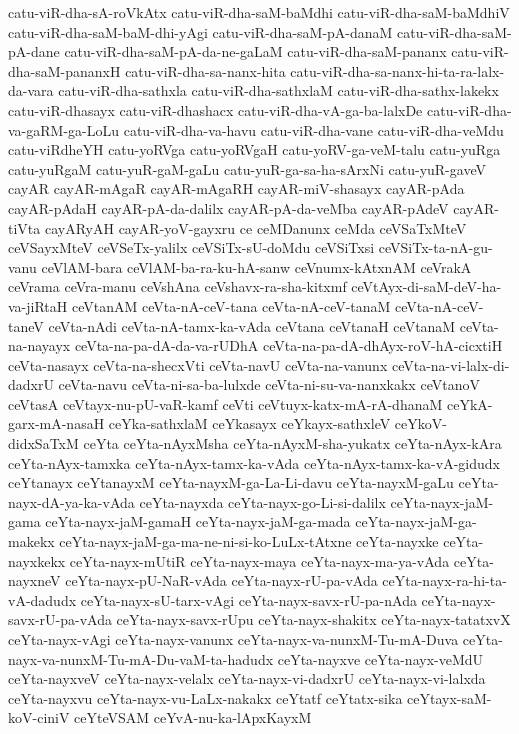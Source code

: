 {catu-viR-dha-sA-roVkAtx
catu-viR-dha-saM-baMdhi
catu-viR-dha-saM-baMdhiV
catu-viR-dha-saM-baM-dhi-yAgi
catu-viR-dha-saM-pA-danaM
catu-viR-dha-saM-pA-dane
catu-viR-dha-saM-pA-da-ne-gaLaM
catu-viR-dha-saM-pananx
catu-viR-dha-saM-pananxH
catu-viR-dha-sa-nanx-hita
catu-viR-dha-sa-nanx-hi-ta-ra-lalx-da-vara
catu-viR-dha-sathxla
catu-viR-dha-sathxlaM
catu-viR-dha-sathx-lakekx
catu-viR-dhasayx
catu-viR-dhashacx
catu-viR-dha-vA-ga-ba-lalxDe
catu-viR-dha-va-gaRM-ga-LoLu
catu-viR-dha-va-havu
catu-viR-dha-vane
catu-viR-dha-veMdu
catu-viRdheYH
catu-yoRVga
catu-yoRVgaH
catu-yoRV-ga-veM-talu
catu-yuRga
catu-yuRgaM
catu-yuR-gaM-gaLu
catu-yuR-ga-sa-ha-sArxNi
catu-yuR-gaveV
cayAR
cayAR-mAgaR
cayAR-mAgaRH
cayAR-miV-shasayx
cayAR-pAda
cayAR-pAdaH
cayAR-pA-da-dalilx
cayAR-pA-da-veMba
cayAR-pAdeV
cayAR-tiVta
cayARyAH
cayAR-yoV-gayxru
ce
ceMDanunx
ceMda
ceVSaTxMteV
ceVSayxMteV
ceVSeTx-yalilx
ceVSiTx-sU-doMdu
ceVSiTxsi
ceVSiTx-ta-nA-gu-vanu
ceVlAM-bara
ceVlAM-ba-ra-ku-hA-sanw
ceVnumx-kAtxnAM
ceVrakA
ceVrama
ceVra-manu
ceVshAna
ceVshavx-ra-sha-kitxmf
ceVtAyx-di-saM-deV-ha-va-jiRtaH
ceVtanAM
ceVta-nA-ceV-tana
ceVta-nA-ceV-tanaM
ceVta-nA-ceV-taneV
ceVta-nAdi
ceVta-nA-tamx-ka-vAda
ceVtana
ceVtanaH
ceVtanaM
ceVta-na-nayayx
ceVta-na-pa-dA-da-va-rUDhA
ceVta-na-pa-dA-dhAyx-roV-hA-cicxtiH
ceVta-nasayx
ceVta-na-shecxVti
ceVta-navU
ceVta-na-vanunx
ceVta-na-vi-lalx-di-dadxrU
ceVta-navu
ceVta-ni-sa-ba-lulxde
ceVta-ni-su-va-nanxkakx
ceVtanoV
ceVtasA
ceVtayx-nu-pU-vaR-kamf
ceVti
ceVtuyx-katx-mA-rA-dhanaM
ceYkA-garx-mA-nasaH
ceYka-sathxlaM
ceYkasayx
ceYkayx-sathxleV
ceYkoV-didxSaTxM
ceYta
ceYta-nAyxMsha
ceYta-nAyxM-sha-yukatx
ceYta-nAyx-kAra
ceYta-nAyx-tamxka
ceYta-nAyx-tamx-ka-vAda
ceYta-nAyx-tamx-ka-vA-gidudx
ceYtanayx
ceYtanayxM
ceYta-nayxM-ga-La-Li-davu
ceYta-nayxM-gaLu
ceYta-nayx-dA-ya-ka-vAda
ceYta-nayxda
ceYta-nayx-go-Li-si-dalilx
ceYta-nayx-jaM-gama
ceYta-nayx-jaM-gamaH
ceYta-nayx-jaM-ga-mada
ceYta-nayx-jaM-ga-makekx
ceYta-nayx-jaM-ga-ma-ne-ni-si-ko-LuLx-tAtxne
ceYta-nayxke
ceYta-nayxkekx
ceYta-nayx-mUtiR
ceYta-nayx-maya
ceYta-nayx-ma-ya-vAda
ceYta-nayxneV
ceYta-nayx-pU-NaR-vAda
ceYta-nayx-rU-pa-vAda
ceYta-nayx-ra-hi-ta-vA-dadudx
ceYta-nayx-sU-tarx-vAgi
ceYta-nayx-savx-rU-pa-nAda
ceYta-nayx-savx-rU-pa-vAda
ceYta-nayx-savx-rUpu
ceYta-nayx-shakitx
ceYta-nayx-tatatxvX
ceYta-nayx-vAgi
ceYta-nayx-vanunx
ceYta-nayx-va-nunxM-Tu-mA-Duva
ceYta-nayx-va-nunxM-Tu-mA-Du-vaM-ta-hadudx
ceYta-nayxve
ceYta-nayx-veMdU
ceYta-nayxveV
ceYta-nayx-velalx
ceYta-nayx-vi-dadxrU
ceYta-nayx-vi-lalxda
ceYta-nayxvu
ceYta-nayx-vu-LaLx-nakakx
ceYtatf
ceYtatx-sika
ceYtayx-saM-koV-ciniV
ceYteVSAM
ceYvA-nu-ka-lApxKayxM
}
